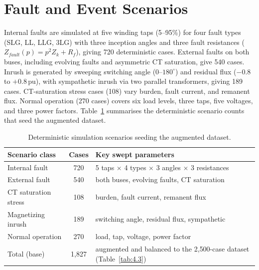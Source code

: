 \documentclass[12pt,a4paper,oneside]{report}
\begin{document}
\section{Fault and Event Scenarios}
Internal faults are simulated at five winding taps (5--95\%) for four fault types (SLG, LL, LLG, 3LG) with three inception angles and three fault resistances ($Z_{fault}(p)=p^2 Z_k+R_f$), giving 720 deterministic cases. External faults on both buses, including evolving faults and asymmetric CT saturation, give 540 cases. Inrush is generated by sweeping switching angle ($0$--$180^\circ$) and residual flux ($-0.8$ to $+0.8$\,pu), with sympathetic inrush via two parallel transformers, giving 189 cases. CT-saturation stress cases (108) vary burden, fault current, and remanent flux. Normal operation (270 cases) covers six load levels, three taps, five voltages, and three power factors. Table~\ref{tab:scen} summarises the deterministic scenario counts that seed the augmented dataset.
\begin{table}[H]\centering\caption{Deterministic simulation scenarios seeding the augmented dataset.}\label{tab:scen}
\begin{tabular}{@{}lcl@{}}\toprule \textbf{Scenario class} & \textbf{Cases} & \textbf{Key swept parameters}\\ \midrule
Internal fault & 720 & 5 taps $\times$ 4 types $\times$ 3 angles $\times$ 3 resistances\\
External fault & 540 & both buses, evolving faults, CT saturation\\
CT saturation stress & 108 & burden, fault current, remanent flux\\
Magnetizing inrush & 189 & switching angle, residual flux, sympathetic\\
Normal operation & 270 & load, tap, voltage, power factor\\ \midrule
Total (base) & 1{,}827 & augmented and balanced to the 2{,}500-case dataset (Table~\ref{tab:4.3})\\ \bottomrule
\end{tabular}\end{table}
\end{document}
